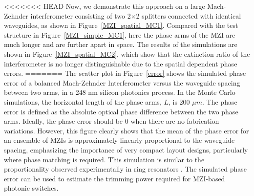 \documentclass[journal]{spie}
\begin{document}
<<<<<<< HEAD
Now, we demonstrate this approach on a large Mach-Zehnder interferometer consisting of two 2$\times$2 splitters connected with identical waveguides, as shown in Figure~\ref{MZI_spatial_MC1}. Compared with the test structure in Figure~\ref{MZI_simple_MC1}, here the phase arms of the MZI are much longer and are further apart in space.  The results of the simulations are shown in Figure~\ref{MZI_spatial_MC2}, which show that the extinction ratio of the interferometer is no longer distinguishable due to the spatial dependent phase errors.
=======
The scatter plot in Figure~\ref{error} shows the simulated phase error of a balanced Mach-Zehnder Interferometer versus the waveguide spacing between two arms, in a 248 nm silicon photonics process. In the Monte Carlo simulations, the horizontal length of the phase arms, $L$,  is 200 $\mu m$. The phase error is defined as the absolute optical phase difference between the two phase arms. Ideally, the phase error should be 0 when there are no fabrication variations. However, this figure clearly shows that the mean of the phase error for an ensemble of MZIs is approximately linearly proportional to the waveguide spacing, emphasizing the importance of very compact layout designs, particularly where phase matching is required.  This simulation is similar to the proportionality  observed experimentally in ring resonators \cite{lukas14:OFC}.  The simulated phase error can be used to estimate the trimming power required for MZI-based photonic switches. 
\end{document}
